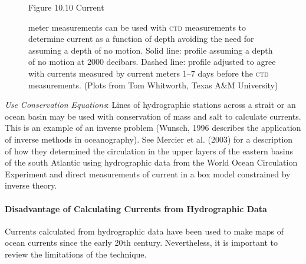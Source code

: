 \begin{enumerate}
\begin{figure}[t!]
\footnotesize
Figure 10.10 Current \rule{0mm}{3ex }meter measurements can be used
with \textsc{ctd} measurements to determine current as a
function of depth avoiding the need for assuming a depth of no
motion. Solid line: profile assuming a depth of no motion at 2000
decibars. Dashed line: profile adjusted to agree with currents
measured by current meters 1--7 days before the \textsc{ctd}
measurements.  (Plots from Tom Whitworth, Texas A\&M University)
\label{fig:whitplot}
\vspace{-3ex}
\end{figure}

\vitem \textit{Use Conservation Equations}: Lines of hydrographic
stations across a strait or an ocean
basin may be used with conservation of mass and salt to calculate
currents. This is an example of an inverse problem (Wunsch, 1996
describes the application of inverse methods in oceanography). See
Mercier et al. (2003) for a description of how they determined the
circulation in the upper layers of the eastern basins of the south
Atlantic using hydrographic data from the World Ocean Circulation
Experiment and direct measurements of current in a box model constrained by inverse theory.
\end{enumerate}

\paragraph{Disadvantage of Calculating Currents from Hydrographic Data}
Currents calculated from
hydrographic data
have been used to make maps of ocean currents since the early 20th
century. Nevertheless, it is important to review the limitations of
the technique.

